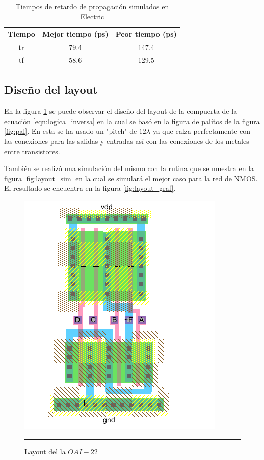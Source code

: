 \documentclass[12pt,a4paper]{article} %
\begin{document}
\begin{table}\label{table:Tabla_propagacion}
\begin{center}
\begin{tabular}{c||c||c}
Tiempo  & Mejor tiempo (ps) & Peor tiempo (ps)\\
\hline
\hline
tr & 79.4 & 147.4 \\
tf & 58.6 & 129.5 \\
\hline
\end{tabular}
\caption{Tiempos de retardo de propagación simulados en Electric}
\end{center}
\end{table}

\subsection{Diseño del layout}

En la figura \ref{fig:layout} se puede observar el diseño del layout de la compuerta de la ecuación \ref{eqn:logica_inversa} en la cual se basó en la figura de palitos de la figura \ref{fig:pal}. En esta se ha usado un "pitch" de $12\lambda$ ya que calza perfectamente con las conexiones para las salidas y entradas así con las conexiones de los metales entre transistores.

También se realizó una simulación del mismo con la rutina que se muestra en la figura \ref{fig:layout_sim} en la cual se simulará el mejor caso para la red de NMOS. El resultado se encuentra en la figura \ref{fig:layout_graf}.

\begin{figure}[htbp]
\begin{center}
    \includegraphics[scale=0.5]{./layout.png}
    \rule{35em}{0.5pt}
  \caption[Captura]{Layout del la $OAI-22$}
  \label{fig:layout}
  \end{center}
\end{figure}
\end{document}
